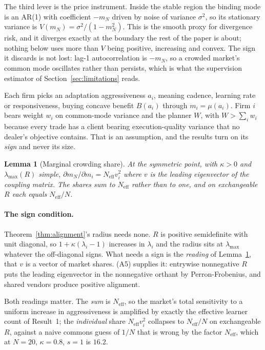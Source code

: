 \documentclass{article}
\theoremstyle{plain}
\newtheorem{lemma}[theorem]{Lemma}
\theoremstyle{definition}
\newcommand{\Neff}{N_{\mathrm{eff}}}
\newcommand{\mN}{m_N}
\newcommand{\lmax}{\lambda_{\max}}
\begin{document}
The third lever is the price instrument. Inside the stable region the binding mode is an AR(1) with coefficient $-\mN$ driven by noise of variance $\sigma^2$, so its stationary variance is $V(\mN) = \sigma^2/(1-\mN^2)$. This is the smooth proxy for divergence risk, and it diverges exactly at the boundary the rest of the paper is about; nothing below uses more than $V$ being positive, increasing and convex. The sign it discards is not lost: lag-1 autocorrelation is $-\mN$, so a crowded market's common mode oscillates rather than persists, which is what the supervision estimator of Section~\ref{sec:limitations} reads.

Each firm picks an adaptation aggressiveness $a_i$, meaning cadence, learning rate or responsiveness, buying concave benefit $B(a_i)$ through $m_i = \mu(a_i)$. Firm $i$ bears weight $w_i$ on common-mode variance and the planner $W$, with $W > \sum_i w_i$ because every trade has a client bearing execution-quality variance that no dealer's objective contains. That is an assumption, and the results turn on its \emph{sign} and never its size.

\begin{lemma}[Marginal crowding share]
\label{lem:share}
At the symmetric point, with $\kappa > 0$ and $\lmax(R)$ simple, $\partial \mN/\partial m_i = \Neff v_i^2$ where $v$ is the leading eigenvector of the coupling matrix. The shares sum to $\Neff$ rather than to one, and on exchangeable $R$ each equals $\Neff/N$.
\end{lemma}

\paragraph{The sign condition.}
Theorem~\ref{thm:alignment}'s radius needs none. $R$ is positive semidefinite with unit diagonal, so $1+\kappa(\lambda_i-1)$ increases in $\lambda_i$ and the radius sits at $\lmax$ whatever the off-diagonal signs. What needs a sign is the \emph{reading} of Lemma~\ref{lem:share}, that $v$ is a vector of market shares. (A5) supplies it: entrywise nonnegative $R$ puts the leading eigenvector in the nonnegative orthant by Perron-Frobenius, and shared vendors produce positive alignment.

Both readings matter. The \emph{sum} is $\Neff$, so the market's total sensitivity to a uniform increase in aggressiveness is amplified by exactly the effective learner count of Result~1; the \emph{individual} share $\Neff v_i^2$ collapses to $\Neff/N$ on exchangeable $R$, against a naive commons guess of $1/N$ that is wrong by the factor $\Neff$, which at $N=20$, $\kappa=0.8$, $s=1$ is $16.2$.
\end{document}
